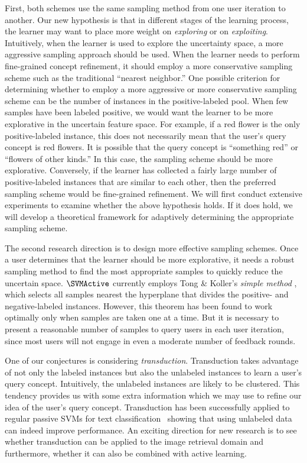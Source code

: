 First, both schemes use the same sampling method from one
user iteration to another.  Our new hypothesis is that
in different stages of the learning process, the learner
may want to place more weight on {\em exploring} or
on {\em exploiting}.
Intuitively, when the learner is used to explore the
uncertainty space, a more aggressive sampling approach should be used. 
When the learner needs to perform fine-grained concept refinement, 
it should employ a more
conservative sampling scheme such as the traditional ``nearest neighbor.''
One possible criterion for determining whether to
employ a more
aggressive or more conservative sampling scheme 
can be the number of instances in the
positive-labeled pool.  When 
few samples have been labeled positive, we would 
want the learner 
to be more explorative in the uncertain feature space.
For example, if a red flower is
the only positive-labeled instance, this does not necessarily
mean that the user's query concept is red flowers.  It is
possible that the query concept is ``something red'' or
``flowers of other kinds.''  In this case,
the sampling scheme 
should be more explorative.  Conversely, if the learner has
collected a fairly large number of positive-labeled instances
that are similar to each other, then the preferred sampling
scheme would be 
fine-grained refinement.  We will first conduct extensive
experiments to examine whether the above hypothesis
holds.  If it does hold,
we will develop a theoretical framework for adaptively
determining the appropriate sampling scheme.

The second research
direction is to design more effective sampling schemes.
Once a user determines that the learner 
should be more explorative, 
it needs a robust sampling method to find the most appropriate samples
to quickly reduce the uncertain space.
$\SVMActive$ currently employs Tong \&
Koller's {\em simple method} \cite{TK00-b}, which selects all samples 
nearest the hyperplane that divides the positive-
and negative-labeled instances.  However, this theorem
has been found to work optimally only when
samples are taken one at a time.  But it is
necessary to present a reasonable number
of samples to query users in each user iteration, since
most users will not engage in even a moderate
number of feedback rounds.  

One of our conjectures is considering {\em transduction}.
{Transduction} takes advantage of not only the labeled instances but
also the unlabeled instances to learn a user's query concept.
Intuitively, the unlabeled instances are likely to be clustered. This
tendency provides us with some extra information which we may use to
refine our idea of the user's query concept.  Transduction
has been successfully applied to regular passive SVMs for text
classification~\cite{Joachims:ICML99} showing that using unlabeled
data can indeed improve performance. An exciting 
direction for new research is to see
whether transduction can be applied to the image retrieval domain and
furthermore, whether it can also be combined with active learning.

